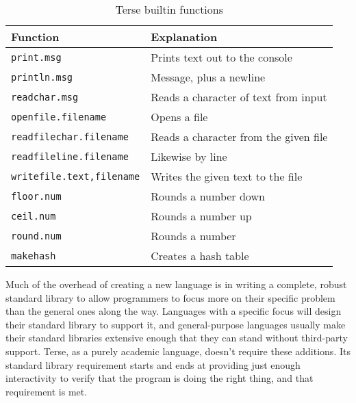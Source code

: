 \documentclass[12pt]{report}
\newcommand{\code}[1]{\texttt{#1}}
\begin{document}
\begin{table}
  \begin{tabular}{ | l | l | }
    \hline
    Function & Explanation \\
    \hline \hline
    \code{print.msg}				& Prints text out to the console		\\ \hline
    \code{println.msg}				& Message, plus a newline				\\ \hline
    \code{readchar.msg}				& Reads a character of text from input	\\ \hline
    \code{openfile.filename}		& Opens a file							\\ \hline
    \code{readfilechar.filename}	& Reads a character from the given file	\\ \hline
    \code{readfileline.filename}	& Likewise by line						\\ \hline
    \code{writefile.text,filename}	& Writes the given text to the file		\\ \hline
    \code{floor.num}				& Rounds a number down					\\ \hline
    \code{ceil.num}					& Rounds a number up					\\ \hline
    \code{round.num}				& Rounds a number						\\ \hline
    \code{makehash}					& Creates a hash table					\\ \hline
  \end{tabular}
  \caption{Terse builtin functions}
\end{table}

Much of the overhead of creating a new language\footnotemark{} is in
writing a complete, robust standard library to allow programmers to
focus more on their specific problem than the general ones along the
way. Languages with a specific focus will design their standard
library to support it, and general-purpose languages usually make
their standard libraries extensive enough that they can stand without
third-party support. Terse, as a purely academic language, doesn't
require these additions. Its standard library requirement starts and
ends at providing just enough interactivity to verify that the program
is doing the right thing, and that requirement is met.

\end{document}
